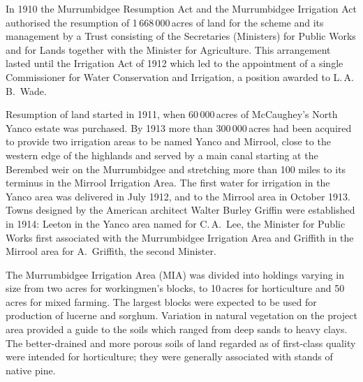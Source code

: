 In 1910 the Murrumbidgee Resumption Act and the Murrumbidgee
Irrigation Act authorised the resumption of 1\,668\,000\,acres of land
for the scheme and its management by a Trust consisting of the
Secretaries (Ministers) for Public Works and for Lands together with
the Minister for Agriculture. This arrangement lasted until the
Irrigation Act of 1912 which led to the appointment of a single
Commissioner for Water Conservation and Irrigation, a position awarded
to L.\,A.\,B.~Wade.

Resumption of land started in 1911, when 60\,000\,acres of
McCaugh\-ey's North Yanco estate was purchased.  By 1913 more than
300\,000\,acres had been acquired to provide two irrigation areas to
be named Yanco and Mirrool,   close to the
western edge of the highlands and served by a main canal starting at
the Berembed weir  on the Murrumbidgee and
stretching more than 100 miles to its terminus in the Mirrool
Irrigation Area. The first water for irrigation in the Yanco area was
delivered in July 1912, and to the Mirrool area in October 1913.
Towns designed by the American architect Walter Burley Griffin
 were established in 1914: Leeton
 in the Yanco area named for C.\,A.~Lee,  the Minister for Public Works first associated with the
Murrumbidgee Irrigation Area and Griffith  in the
Mirrool area for A.~Griffith, the second
Minister.

The Murrumbidgee Irrigation Area (MIA)  was divided into holdings varying in size from two
acres for workingmen's blocks, to 10\,acres for horticulture and
50\,acres for mixed farming.  The largest blocks were expected to be
used for production of lucerne and sorghum.  Variation in natural
vegetation on the project area provided a guide to the soils which
ranged from deep sands to heavy clays.  The better-drained and more
porous soils of land regarded as of first-class quality were intended
for horticulture; they were generally associated with stands of native
pine.

